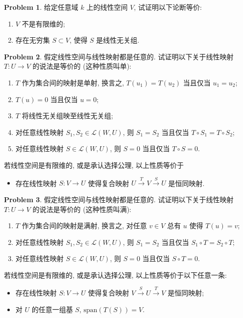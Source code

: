 \documentclass{MainStyle}
\theoremstyle{definition}
\newtheorem{problem}{Problem}
\begin{document}
\begin{problem}
给定任意域 $k$ 上的线性空间 $V$, 试证明以下论断等价:
\begin{enumerate}
    \item $V$ 不是有限维的;
    \item 存在无穷集 $S\subset V$, 使得 $S$ 是线性无关组.
\end{enumerate}
\end{problem}

\begin{problem}
假定线性空间与线性映射都是任意的. 试证明以下关于线性映射 $T:U\to V$ 的说法是等价的 (这种性质叫单):
\begin{enumerate}
    \item $T$ 作为集合间的映射是单射, 换言之, $T(u_1)=T(u_2)$ 当且仅当 $u_1=u_2$;
    \item $T(u)=0$ 当且仅当 $u=0$;
    \item $T$ 将线性无关组映至线性无关组;
    \item 对任意线性映射 $S_1,S_2\in \mathcal L(W,U)$, 则 $S_1=S_2$ 当且仅当 $T\circ S_1=T\circ S_2$;
    \item 对任意线性映射 $S\in \mathcal L(W,U)$, 则 $S=0$ 当且仅当 $T\circ S=0$.
\end{enumerate}
若线性空间是有限维的, 或是承认选择公理, 以上性质等价于
\begin{itemize}
    \item 存在线性映射 $S:V\to U$ 使得复合映射 $U\xrightarrow{ T} V\xrightarrow{S} U$ 是恒同映射.
\end{itemize}
\end{problem}


\begin{problem}
假定线性空间与线性映射都是任意的. 试证明以下关于线性映射 $T:U\to V$ 的说法是等价的 (这种性质叫满):
\begin{enumerate}
    \item $T$ 作为集合间的映射是满射, 换言之, 对任意 $v\in V$ 总有 $u$ 使得 $T(u)=v$;
    \item 对任意线性映射 $S_1,S_2\in \mathcal L(W,U)$, 则 $S_1=S_2$ 当且仅当 $S_1\circ T=S_2\circ T$;
    \item 对任意线性映射 $S\in \mathcal L(W,U)$, 则 $S=0$ 当且仅当 $S\circ T=0$.
\end{enumerate}
若线性空间是有限维的, 或是承认选择公理, 以上性质等价于以下任意一条:
\begin{itemize}
    \item 存在线性映射 $S:V\to U$ 使得复合映射 $V\xrightarrow{ S} U\xrightarrow{T} V$ 是恒同映射;
    \item 对 $U$ 的任意一组基 $S$, $\mathrm{span}(T(S))=V$.
\end{itemize}
\end{problem}
\end{document}

